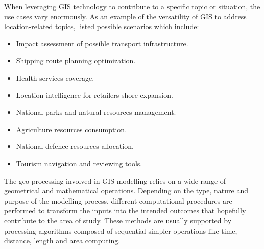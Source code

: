 \documentclass[12pt, a4paper]{report}
\begin{document}
When leveraging GIS technology to contribute to a specific topic or situation, the use cases vary enormously. As an example of the versatility of GIS to address location-related topics, \citep{longleyGeographicInformationScience2015} listed possible scenarios which include:

\begin{itemize}
\item Impact assessment of possible transport infrastructure.
\item Shipping route planning optimization.
\item Health services coverage.
\item Location intelligence for retailers shore expansion.
\item National parks and natural resources management.
\item Agriculture resources consumption.
\item National defence resources allocation.
\item Tourism navigation and reviewing tools.
\end{itemize}

The geo-processing involved in GIS modelling relies on a wide range of geometrical and mathematical operations. Depending on the type, nature and purpose of the modelling process, different computational procedures are performed to transform the inputs into the intended outcomes that hopefully contribute to the area of study. These methods are usually supported by processing algorithms composed of sequential simpler operations like time, distance, length and area computing. 




\end{document}
